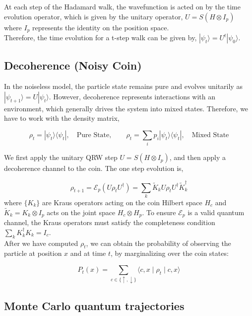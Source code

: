 \documentclass[11pt]{article}
\begin{document}
\noindent At each step of the Hadamard walk, the wavefunction is acted on by the time evolution operator, which is given by the unitary operator, $U=S(H\otimes I_p)$ where $I_p$ represents the identity on the position space. \\

\noindent Therefore, the time evolution for a t-step walk can be given by, $|\psi_t\rangle = U^t|\psi_0\rangle$.\\


\subsection*{Decoherence (Noisy Coin)}
In the noiseless model, the particle state remains pure and evolves unitarily as $|\psi_{t+1}\rangle = U |\psi_t\rangle$. However, decoherence represents interactions with an environment, which generally drives the system into mixed states. Therefore, we have to work with the density matrix,

\[
\rho_t=|\psi_t\rangle\langle\psi_t|,\quad\text{Pure State},\qquad \rho_t=\sum_ip_i|\psi_t\rangle\langle\psi_t|,\quad\text{Mixed State}
\]

\noindent We first apply the unitary QRW step $U=S(H \otimes I_p)$, and then apply a decoherence channel to the coin. The one step evolution is,

\begin{equation}\label{eq:1}
\rho_{t+1}
= \mathcal{E}_p( U \rho_t U^\dagger)
= \sum_{k} \tilde K_k U \rho_t U^\dagger \tilde K_k^\dagger
\end{equation}
where $\{K_k\}$ are Kraus operators acting on the coin Hilbert space $H_c$ and $\tilde K_k = K_k \otimes I_p$ acts on the joint space $H_c \otimes H_p$. To ensure $\mathcal{E}_p$ is a valid quantum channel, the Kraus operators must satisfy the completeness condition $\sum_k K_k^\dagger K_k = I_c$.\\

\noindent After we have computed $\rho_t$, we can obtain the probability of observing the particle at position $x$ and at time $t$, by marginalizing over the coin states:

\begin{equation}\label{eq:2}
P_t(x) = \sum_{c\in\{\uparrow,\downarrow\}} \langle c,x \mid \rho_t \mid c,x\rangle
\end{equation}

\subsection*{Monte Carlo quantum trajectories}
\end{document}
